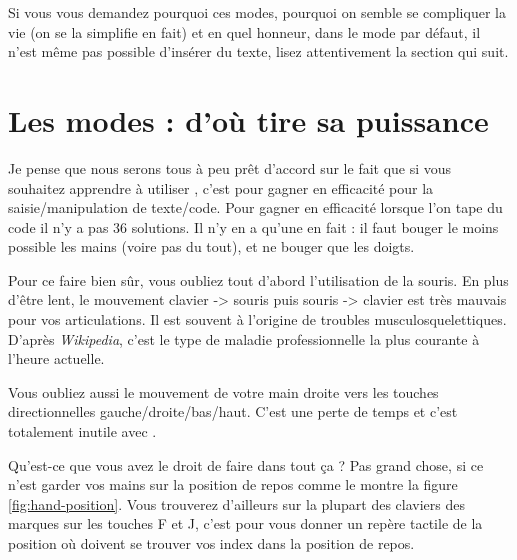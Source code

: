 Si vous vous demandez pourquoi ces modes, pourquoi on semble se compliquer la vie (on se la simplifie en fait) et en quel honneur, dans le mode par défaut, il n'est même pas possible d'insérer du texte, lisez attentivement la section qui suit.

\section{Les modes : d'où \vim tire sa puissance}\label{sec:modes}

Je pense que nous serons tous à peu prêt d'accord sur le fait que si vous souhaitez apprendre à utiliser \vim, c'est pour gagner en efficacité pour la saisie/manipulation de texte/code. Pour gagner en efficacité lorsque l'on tape du code il n'y a pas 36 solutions. Il n'y en a qu'une en fait : il faut bouger le moins possible les mains (voire pas du tout), et ne bouger que les doigts.

Pour ce faire bien sûr, vous oubliez tout d'abord l'utilisation de la souris. En plus d'être lent, le mouvement clavier -> souris puis souris -> clavier est très mauvais pour vos articulations. Il est souvent à l'origine de troubles musculosquelettiques. D'après \emph{Wikipedia}, c'est le type de maladie professionnelle la plus courante à l'heure actuelle.

Vous oubliez aussi le mouvement de votre main droite vers les touches directionnelles gauche/droite/bas/haut. C'est une perte de temps et c'est totalement inutile avec \vim.

Qu'est-ce que vous avez le droit de faire dans tout ça ? Pas grand chose, si ce n'est garder vos mains sur la position de repos comme le montre la figure \ref{fig:hand-position}. Vous trouverez d'ailleurs sur la plupart des claviers des marques sur les touches F et J, c'est pour vous donner un repère tactile de la position où doivent se trouver vos index dans la position de repos.


